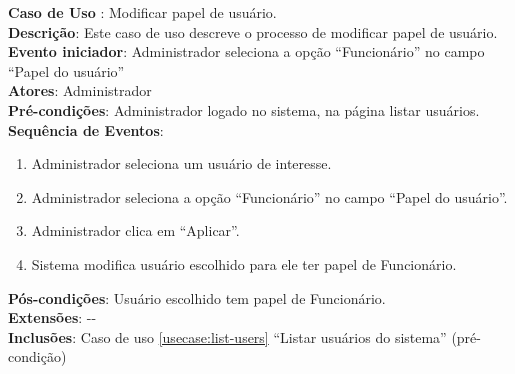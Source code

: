 \documentclass[]{politex}
\begin{document}
\noindent \textbf{Caso de Uso }: Modificar papel de usuário. \\
\textbf{Descrição}: Este caso de uso descreve o processo de modificar papel de
usuário. \\
\textbf{Evento iniciador}: Administrador seleciona a opção ``Funcionário'' no campo
``Papel do usuário'' \\
\textbf{Atores}: Administrador \\
\textbf{Pré-condições}: Administrador logado no sistema, na página listar
usuários. \\
\textbf{Sequência de Eventos}:
\begin{enumerate}
\item Administrador seleciona um usuário de interesse.
\item Administrador seleciona a opção ``Funcionário'' no campo ``Papel do usuário''.
\item Administrador clica em ``Aplicar''.
\item Sistema modifica usuário escolhido para ele ter papel de Funcionário.
\end{enumerate}
\textbf{Pós-condições}: Usuário escolhido tem papel de Funcionário. \\
\textbf{Extensões}: -{}- \\
\textbf{Inclusões}: Caso de uso \ref{usecase:list-users} ``Listar usuários do sistema'' (pré-condição) \\


%

%
\end{document}
